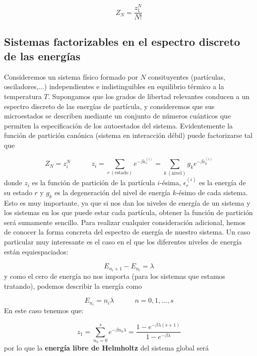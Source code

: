 \documentclass[12pt,a4paper]{article}
\numberwithin{equation}{section}
\numberwithin{figure}{section}
\newcommand{\tquad}{\quad \quad \quad}
\theoremstyle{definition}
\begin{document}
\begin{equation}
Z_N = \frac{z_1^N}{N!}
\end{equation}

\subsection{Sistemas factorizables en el espectro discreto de las energías}

Consideremos un sistema físico formado por $N$ consituyentes (partículas, osciladores,...) independientes e indistinguibles en equilibrio térmico a la temperatura $T$. Supongamos que los grados de libertad relevantes conducen a un espectro discreto de las energías de partícula, y consideremos que sus microestados se describen mediante un conjunto de números cuánticos que permiten la especificación de los autoestados del sistema. Evidentemente la función de partición canónica (sistema en interacción débil) puede factorizarse tal que

\begin{equation}
Z_N = z_i^N \tquad z_i = \sum_{r \ (\mathrm{estado})} e^{-\beta \epsilon_r^{(i)}} = \sum_{k \ (\mathrm{nivel})} g_k e^{-\beta \epsilon_k^{(i)}}
\end{equation}
donde $z_i$ es la función de partición de la partícula $i$-ésima, $\epsilon_r^{(i)}$ es la energía de su estado $r$ y $g_k$ es la degeneración del nivel de energía $k$-ésimo de cada sistema. Esto es muy importante, ya que si nos dan los niveles de energía de un sistema y los sistemas en los que puede estar cada partícula, obtener la función de partición será sumamente sencillo. Para realizar cualquier consideración adicional, hemos de conocer la forma concreta del espectro de energía de nuestro sistema. Un caso particular muy interesante es el caso en el que los diferentes niveles de energía están equiespaciados: 

\begin{equation}
E_{n_i+1} - E_{n_i} = \lambda 
\end{equation}
y como el cero de energía no nos importa (para los sistemas que estamos tratando), podemos describir la energía como

\begin{equation}
E_{n_i} = n_i \lambda \tquad n=0,1,...,s
\end{equation}
En este caso tenemos que:

\begin{equation}
z_1 = \sum_{n_k=0}^s e^{-\beta n_k \lambda} = \frac{1- e^{-\beta \lambda (s+1)}}{1-e^{-\beta \lambda}}
\end{equation}
por lo que la \textbf{energía libre de Helmholtz} del sistema global será
\end{document}
